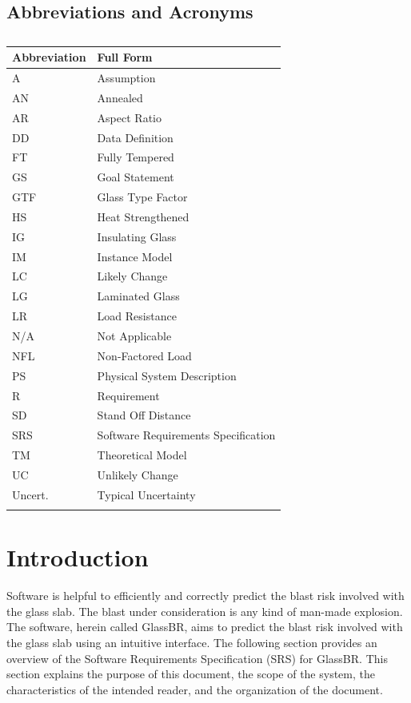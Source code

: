 \documentclass[12pt]{article}
\begin{document}
\subsection{Abbreviations and Acronyms}
\label{Sec:TAbbAcc}
\begin{longtable}{l l}
\toprule
Abbreviation & Full Form
\\
\midrule
\endhead
A & Assumption
\\
AN & Annealed
\\
AR & Aspect Ratio
\\
DD & Data Definition
\\
FT & Fully Tempered
\\
GS & Goal Statement
\\
GTF & Glass Type Factor
\\
HS & Heat Strengthened
\\
IG & Insulating Glass
\\
IM & Instance Model
\\
LC & Likely Change
\\
LG & Laminated Glass
\\
LR & Load Resistance
\\
N/A & Not Applicable
\\
NFL & Non-Factored Load
\\
PS & Physical System Description
\\
R & Requirement
\\
SD & Stand Off Distance
\\
SRS & Software Requirements Specification
\\
TM & Theoretical Model
\\
UC & Unlikely Change
\\
Uncert. & Typical Uncertainty
\\
\bottomrule
\caption{}
\label{Table:TAbbAcc}
\end{longtable}
\section{Introduction}
\label{Sec:Intro}
Software is helpful to efficiently and correctly predict the blast risk involved with the glass slab. The blast under consideration is any kind of man-made explosion. The software, herein called GlassBR, aims to predict the blast risk involved with the glass slab using an intuitive interface.
The following section provides an overview of the Software Requirements Specification (SRS) for GlassBR. This section explains the purpose of this document, the scope of the system, the characteristics of the intended reader, and the organization of the document.
\end{document}
